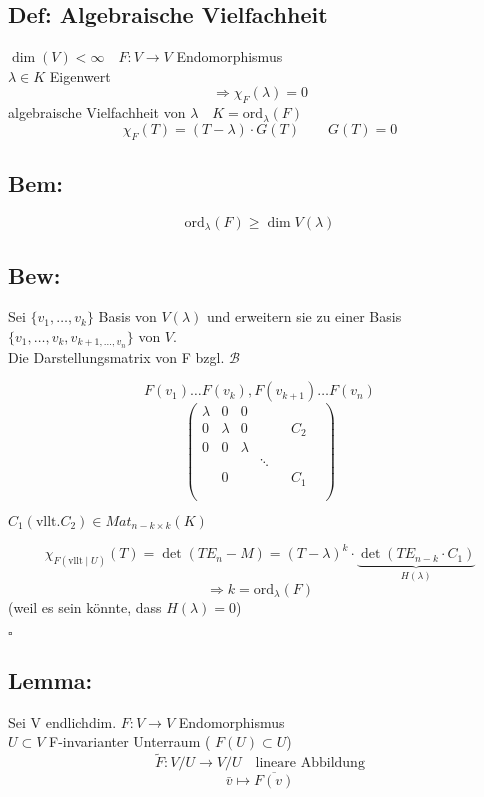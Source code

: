 \documentclass[titlepage,12pt,a4paper,ngerman]{report}
\newcommand{\tx}[1]{\textrm{#1}}
\newcommand{\ov}[1]{\overline{#1}}
\begin{document}
\subsection{Def: Algebraische Vielfachheit}
$\dim(V)< \infty \quad F: V\to V$ Endomorphismus\\
$\lambda \in K$ Eigenwert\\
$$\Rightarrow \chi_{F}(\lambda) = 0$$
algebraische Vielfachheit von $\lambda \quad K = \textrm{ord}_\lambda(F)$
$$\chi_F(T) = (T-\lambda)\cdot G(T) \qquad G(T) = 0$$
\subsection{Bem:}
$$\textrm{ord}_\lambda(F) \ge \dim V(\lambda)$$
\subsection{Bew:}
Sei $ \{v_1,\dots,v_k\}$ Basis von $V(\lambda)$ und erweitern sie zu einer Basis \\
$\{v_1,\dots,v_k,v_{k+1, \dots , v_n}\}$ von $V$.\\
Die Darstellungsmatrix von F bzgl. $\mathcal{B}$ 

$$F(v_1) \dots F(v_k), F(v_{k+1}) \dots F(v_n)$$ 
\nopagebreak
$$\begin{pmatrix}
\lambda   &  0 & 0 & \\
0 & \lambda &  0 & & & C_2\\
0 & 0 &  \lambda & & \\
& & &  \ddots &  \\
& 0 & & & & C_1 & \\
& & & & & \\
\end{pmatrix} $$

$ C_1 (\tx{vllt.} C_2) \in Mat_{n - k \times k} (K)$

$$\chi_{F(\tx{vllt} \mid U)}(T) = \det(TE_n-M) = (T-\lambda)^k\cdot \underbrace{\det(TE_{n-k} \cdot C_1)}_{H(\lambda)}$$
$$\Rightarrow k = \textrm{ord}_\lambda(F)$$
(weil es sein könnte, dass $H(\lambda) = 0$)
\begin{flushright}
	$\square$
\end{flushright}

\subsection{Lemma:}
Sei V endlichdim.
$F: V\to V$ Endomorphismus\\
$U \subset V$ F-invarianter Unterraum ( $F(U) \subset U$)\\
$$\tilde{F}: V/U \to V/U \quad \textrm{lineare Abbildung}$$
$$ \bar{v} \mapsto \ov{F(v)}$$
\end{document}
